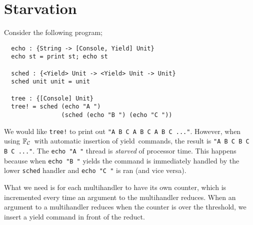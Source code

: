 \documentclass[msc,deptreport,cs]{infthesis} %
\newcommand{\code}[1]{\lstinline{#1}}
\newcommand\countingfrank{$\mathbb{F}_{\cal{C}}$}
\newcommand{\threshc}{{\color{blue} \textsf{t}}}
\newcommand\yield{\textsf{yield}\xspace}
\newcommand{\todo}[1]
           {{\par\noindent\small\color{RoyalPurple}
  \framebox{\parbox{\dimexpr\linewidth-2\fboxsep-2\fboxrule}
    {\textbf{TODO:} #1}}}}
\begin{document}
\section{Starvation}
\label{sec:starvation}

Consider the following program;

\begin{lstlisting}
  echo : {String -> [Console, Yield] Unit}
  echo st = print st; echo st

  sched : {<Yield> Unit -> <Yield> Unit -> Unit}
  sched unit unit = unit

  tree : {[Console] Unit}
  tree! = sched (echo "A ")
                (sched (echo "B ") (echo "C "))
\end{lstlisting}

We would like \code{tree!} to print out \code{"A B C A B C A B C ..."}. However,
when using \countingfrank~with automatic insertion of \yield~commands, the
result is \code{"A B C B C B C ..."}. The \code{echo "A "} thread is
\emph{starved} of processor time. This happens because when \code{echo "B "}
yields the command is immediately handled by the lower \code{sched} handler and
\code{echo "C "} is ran (and vice versa).

What we need is for each multihandler to have its own counter, which is
incremented every time an argument to the multihandler reduces. When an argument
to a multihandler reduces when the counter is over the threshold, we insert a
\yield command in front of the reduct.


\end{document}
